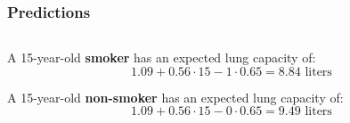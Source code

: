 \documentclass{beamer}
\newenvironment{VerbatimOUT}
 {\VerbatimEnvironment
  \begin{tcolorbox}[
    breakable,
    spartan
  ]%
  \begin{Verbatim}}
 {\end{Verbatim}\end{tcolorbox}}
\begin{document}
\begin{frame}[fragile]
\frametitle{Predictions}
    \begin{columns}
        \begin{column}{0.5\textwidth}
          A 15-year-old \textbf{smoker} has an expected lung capacity of:
          \begin{equation*}
          1.09 + 0.56 \cdot 15 - 1 \cdot 0.65 = 8.84 \text{ liters}
          \end{equation*}
          \vspace{0.3cm}
          
          A 15-year-old \textbf{non-smoker} has an expected lung capacity of:
          \begin{equation*}
          1.09 + 0.56 \cdot 15 - 0 \cdot 0.65 = 9.49 \text{ liters}
          \end{equation*}
        \end{column}
    \end{columns}
\end{frame}
\end{document}
